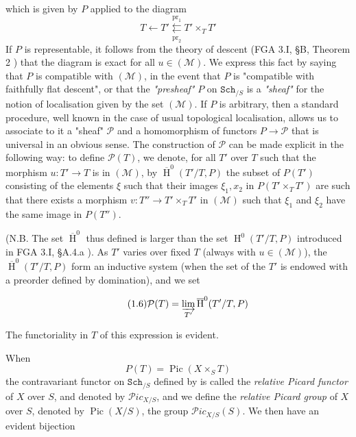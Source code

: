 which is given by $P$ applied to the diagram
\[
    T \leftarrow T' \underset{\mathrm{pr}_2}{\overset{\mathrm{pr}_1}{\leftleftarrows}} T'\times_T T'
\]
If $P$ is representable, it follows from the theory of descent (FGA 3.I, §B, Theorem 2 ) that the diagram  is exact for all $u\in(\mathcal{M})$.
We express this fact by saying that $P$ is compatible with $(\mathcal{M})$, in the event that $P$ is "compatible with faithfully flat descent", or that the \emph{"presheaf"} $P$ on $\mathtt{Sch}_{/S}$ is a \emph{"sheaf"} for the notion of localisation given by the set $(\mathcal{M})$.
If $P$ is arbitrary, then a standard procedure, well known in the case of usual topological localisation, allows us to associate to it a "sheaf" $\mathcal{P}$ and a homomorphism of functors $P\to\mathcal{P}$ that is universal in an obvious sense.
The construction of $\mathcal{P}$ can be made explicit in the following way: to define $\mathcal{P}(T)$, we denote, for all $T'$ over $T$ such that the morphism $u\colon T'\to T$ is in $(\mathcal{M})$, by $\overline{\operatorname{H}}^0(T'/T,P)$ the subset of $P(T')$ consisting of the elements $\xi$ such that their images $\xi_1,x_2$ in $P(T'\times_T T')$ are such that there exists a morphism $v\colon T''\to T'\times_T T'$ in $(\mathcal{M})$ such that $\xi_1$ and $\xi_2$ have the same image in $P(T'')$.

(N.B. The set $\overline{\operatorname{H}}^0$ thus defined is larger than the set $\operatorname{H}^0(T'/T,P)$ introduced in FGA 3.I, §A.4.a ).
As $T'$ varies over fixed $T$ (always with $u\in(\mathcal{M})$), the $\overline{\operatorname{H}}^0(T'/T,P)$ form an inductive system (when the set of the $T'$ is endowed with a preorder defined by domination), and we set

\begin{equation}\tag{1.6}\label{fga3.v-1-equation-1.6}
    \mathcal{P}(T) = \varinjlim_{T'} \overline{\operatorname{H}}^0(T'/T,P)
\end{equation}

The functoriality in $T$ of this expression is evident.

When
\[
    P(T) = \operatorname{Pic}(X\times_S T)
\]
the contravariant functor on $\mathtt{Sch}_{/S}$ defined by  is called the \emph{relative Picard functor} of $X$ over $S$, and denoted by $\mathcal{P}ic_{X/S}$, and we define the \emph{relative Picard group} of $X$ over $S$, denoted by $\operatorname{Pic}(X/S)$, the group $\mathcal{P}ic_{X/S}(S)$.
We then have an evident bijection

